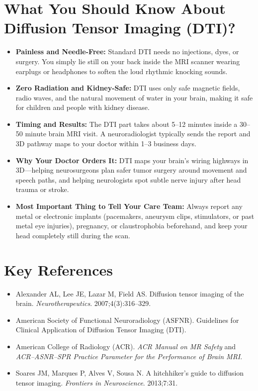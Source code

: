 \section{What You Should Know About Diffusion Tensor Imaging (DTI)?}

\begin{itemize}
    \item \textbf{Painless and Needle-Free:} Standard DTI needs no injections, dyes, or surgery. You simply lie still on your back inside the MRI scanner wearing earplugs or headphones to soften the loud rhythmic knocking sounds.
    \item \textbf{Zero Radiation and Kidney-Safe:} DTI uses only safe magnetic fields, radio waves, and the natural movement of water in your brain, making it safe for children and people with kidney disease.
    \item \textbf{Timing and Results:} The DTI part takes about 5--12 minutes inside a 30--50 minute brain MRI visit. A neuroradiologist typically sends the report and 3D pathway maps to your doctor within 1--3 business days.
    \item \textbf{Why Your Doctor Orders It:} DTI maps your brain's wiring highways in 3D---helping neurosurgeons plan safer tumor surgery around movement and speech paths, and helping neurologists spot subtle nerve injury after head trauma or stroke.
    \item \textbf{Most Important Thing to Tell Your Care Team:} Always report any metal or electronic implants (pacemakers, aneurysm clips, stimulators, or past metal eye injuries), pregnancy, or claustrophobia beforehand, and keep your head completely still during the scan.
\end{itemize}

\section{Key References}

\begin{itemize}
    \item Alexander AL, Lee JE, Lazar M, Field AS. Diffusion tensor imaging of the brain. \textit{Neurotherapeutics}. 2007;4(3):316--329.
    \item American Society of Functional Neuroradiology (ASFNR). Guidelines for Clinical Application of Diffusion Tensor Imaging (DTI).
    \item American College of Radiology (ACR). \textit{ACR Manual on MR Safety} and \textit{ACR--ASNR--SPR Practice Parameter for the Performance of Brain MRI}.
    \item Soares JM, Marques P, Alves V, Sousa N. A hitchhiker's guide to diffusion tensor imaging. \textit{Frontiers in Neuroscience}. 2013;7:31.
\end{itemize}
